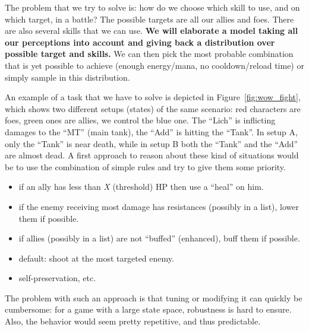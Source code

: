 The problem that we try to solve is: how do we choose which skill to use, and on which target, in a  battle? The possible targets are all our allies and foes. There are also several skills that we can use. \textbf{We will elaborate a model taking all our perceptions into account and giving back a distribution over possible target and skills.} We can then pick the most probable combination that is yet possible to achieve (enough energy/mana, no cooldown/reload time) or simply sample in this distribution. %

An example of a task that we have to solve is depicted in Figure~\ref{fig:wow_fight}, which shows two different setups (states) of the same scenario: red characters are foes, green ones are allies, we control the blue one. The ``Lich'' is inflicting damages to the ``MT'' (main tank), the ``Add'' is hitting the ``Tank''. In setup A, only the ``Tank'' is near death, while in setup B both the ``Tank'' and the ``Add'' are almost dead. A first approach to reason about these kind of situations would be to use the combination of simple rules and try to give them some priority.
\begin{itemize}
    \item if an ally has less than \textit{X} (threshold) HP then use a ``heal'' on him.
    \item if the enemy receiving most damage has resistances (possibly in a list), lower them if possible.
    \item if allies (possibly in a list) are not ``buffed'' (enhanced), buff them if possible.
    \item default: shoot at the most targeted enemy.
    \item self-preservation, etc.
\end{itemize}
The problem with such an approach is that tuning or modifying it can quickly be cumbersome: for a game with a large state space, robustness is hard to ensure. Also, the behavior would seem pretty repetitive, and thus predictable. 

